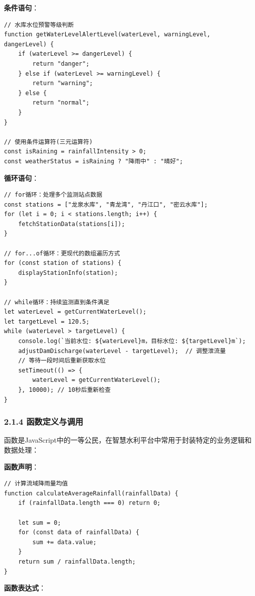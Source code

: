 \textbf{条件语句}：

\begin{lstlisting}
// 水库水位预警等级判断
function getWaterLevelAlertLevel(waterLevel, warningLevel, dangerLevel) {
    if (waterLevel >= dangerLevel) {
        return "danger";
    } else if (waterLevel >= warningLevel) {
        return "warning";
    } else {
        return "normal";
    }
}

// 使用条件运算符(三元运算符)
const isRaining = rainfallIntensity > 0;
const weatherStatus = isRaining ? "降雨中" : "晴好";
\end{lstlisting}

\textbf{循环语句}：

\begin{lstlisting}
// for循环：处理多个监测站点数据
const stations = ["龙泉水库", "青龙湾", "丹江口", "密云水库"];
for (let i = 0; i < stations.length; i++) {
    fetchStationData(stations[i]);
}

// for...of循环：更现代的数组遍历方式
for (const station of stations) {
    displayStationInfo(station);
}

// while循环：持续监测直到条件满足
let waterLevel = getCurrentWaterLevel();
let targetLevel = 120.5;
while (waterLevel > targetLevel) {
    console.log(`当前水位: ${waterLevel}m，目标水位: ${targetLevel}m`);
    adjustDamDischarge(waterLevel - targetLevel);  // 调整泄流量
    // 等待一段时间后重新获取水位
    setTimeout(() => {
        waterLevel = getCurrentWaterLevel();
    }, 10000); // 10秒后重新检查
}
\end{lstlisting}

\subsubsection{2.1.4
函数定义与调用}\label{ux51fdux6570ux5b9aux4e49ux4e0eux8c03ux7528}

函数是JavaScript中的一等公民，在智慧水利平台中常用于封装特定的业务逻辑和数据处理：

\textbf{函数声明}：

\begin{lstlisting}
// 计算流域降雨量均值
function calculateAverageRainfall(rainfallData) {
    if (rainfallData.length === 0) return 0;
    
    let sum = 0;
    for (const data of rainfallData) {
        sum += data.value;
    }
    return sum / rainfallData.length;
}
\end{lstlisting}

\textbf{函数表达式}：


